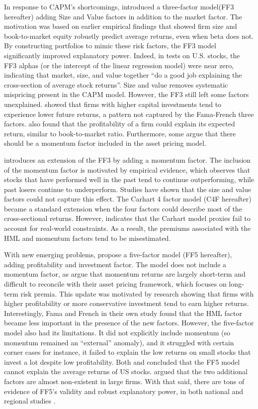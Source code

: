 In response to CAPM's shortcomings,  introduced a three-factor model(FF3 hereafter) adding Size and Value factors in addition to the market factor. The motivation was based on earlier empirical findings that showed firm size and book-to-market equity robustly predict average returns, even when beta does not. By constructing portfolios to mimic these risk factors, the FF3 model significantly improved explanatory power. Indeed, in tests on U.S. stocks, the FF3 alphas (or the intercept of the linear regression model) were near zero, indicating that market, size, and value together “do a good job explaining the cross-section of average stock returns”. Size and value removes systematic mispricing present in the CAPM model. However, the FF3 still left some factors unexplained.  showed that firms with higher capital investments tend to experience lower future returns, a pattern not captured by the Fama-French three factors.  also found that the profitability of a firm could explain its expected return, similar to book-to-market ratio. Furthermore, some argue that there should be a momentum factor included in the asset pricing model.

 introduces an extension of the FF3 by adding a momentum factor. The inclusion of the momentum factor is motivated by empirical evidence, which observes that stocks that have performed well in the past tend to continue outperforming, while past losers continue to underperform. Studies have shown that the size and value factors could not capture this effect. The Carhart 4 factor model (C4F hereafter) became a standard extension when the four factors could describe most of the cross-sectional returns. However,  indicates that the Carhart model proxies fail to account for real-world constraints. As a result, the premiums associated with the HML and momentum factors tend to be misestimated.

With new emerging problems,  propose a five-factor model (FF5 hereafter), adding profitability and investment factor.  The model does not include a momentum factor, as  argue that momentum returns are largely short-term and difficult to reconcile with their asset pricing framework, which focuses on long-term risk premia. This update was motivated by research showing that firms with higher profitability or more conservative investment tend to earn higher returns. Interestingly, Fama and French in their own study found that the HML factor became less important in the presence of the new factors.  However, the five-factor model also had its limitations. It did not explicitly include momentum (so momentum remained an “external” anomaly), and it struggled with certain corner cases for instance, it failed to explain the low returns on small stocks that invest a lot despite low profitability. Both  and  concluded that the FF5 model cannot explain the average returns of US stocks.  argued that the two additional factors are almost non-existent in large firms. With that said, there are tons of evidence of FF5's validity and robust explanatory power, in both national and regional studies \cite{sohor_litreview_2024}.

